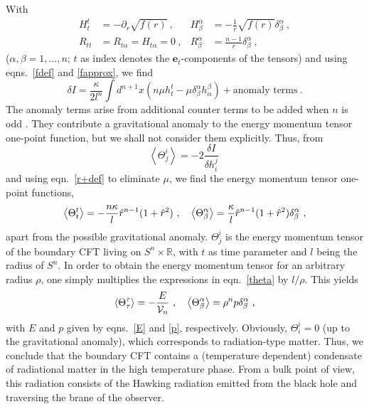 \documentclass[a4paper,12pt]{article}
\begin{document}
With
\begin{equation}
\label{HRrels}
\begin{aligned}
  H^t_t &= - \partial_r \sqrt{f(r)}~,&
  H^\alpha_\beta &= -\frac1r \sqrt{f(r)} \delta^\alpha_\beta~,\\
  R_{tt} &= R_{t\alpha}= H_{t\alpha}=0~,&
  R^\alpha_\beta &= \frac{n-1}r \delta^\alpha_\beta~,
\end{aligned}
\end{equation}
($\alpha, \beta=1,\ldots,n$; $t$ as index denotes the $\mathbf{e}_t$-components
of the tensors) and using eqns.\ \eqref{fdef} and \eqref{fapprox}, we find
\begin{equation}
\label{dI2}
  \delta I = \frac{\kappa}{2l^n} \int d^{n+1}x \left( n\mu h^t_t - \mu
  \delta^\alpha_\beta h^\beta_\alpha \right) + \text{anomaly terms}~.
\end{equation}
The anomaly terms arise from additional counter terms to be added when
$n$ is odd \cite{Henningson98-2}.
They contribute a gravitational anomaly to the energy
momentum tensor one-point function, but we shall not consider them
explicitly. Thus, from
\begin{equation}
\label{thetadef}
 \left\langle \Theta^i_j\right\rangle = -2 \frac{\delta I}{\delta h^j_i}~
\end{equation}
and using eqn.\ \eqref{r+def} to eliminate $\mu$, we find the energy
momentum tensor one-point functions,
\begin{equation}
\label{theta}
  \left\langle\Theta^t_t\right\rangle
  = - \frac{n\kappa}l \hat{r}^{n-1} (1+\hat{r}^2)~,\quad
  \left\langle\Theta^\alpha_\beta\right\rangle
  = \frac{\kappa}l \hat{r}^{n-1} (1+\hat{r}^2) \delta^\alpha_\beta~,
\end{equation}
apart from the possible gravitational anomaly. $\Theta^i_j$ is the
energy momentum tensor of the boundary CFT living on $S^n{\times}
\mathbb {R}$, with $t$ as time parameter and $l$ being the radius of
$S^n$. In order to obtain the energy momentum tensor for an arbitrary
radius $\rho$, one simply multiplies the expressions in eqn.\
\eqref{theta} by $l/\rho$. This yields
\begin{equation}
\label{theta2}
  \left\langle\Theta^\tau_\tau \right\rangle
  = - \frac{E}{\mathcal{V}_n}~,\quad
  \left\langle\Theta^\alpha_\beta\right\rangle
  = \rho^n p \delta^\alpha_\beta~,
\end{equation}
with $E$ and $p$ given by eqns.\ \eqref{E} and \eqref{p}, respectively.
Obviously, $\Theta^i_i=0$ (up to the gravitational anomaly), which
corresponds to radiation-type matter. Thus, we conclude that the boundary
CFT contains a (temperature dependent) condensate of radiational matter in
the high temperature phase. From a bulk point of view, this radiation
consists of the Hawking radiation emitted from the black hole and
traversing the brane of the observer.
\end{document}
